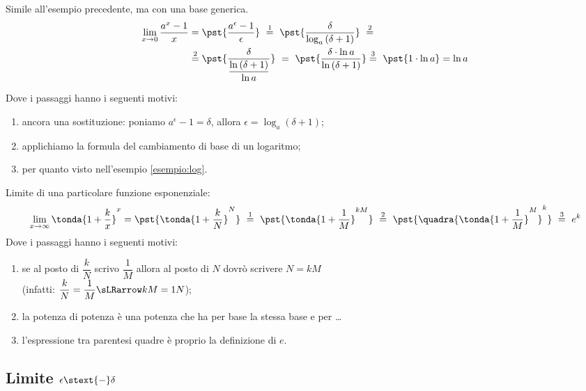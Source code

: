 \begin{esempio}
Simile all'esempio precedente, ma con una base generica.
\begin{align*}
\lim_{x \rightarrow 0} \dfrac{a^x-1}{x} &=
\pst{\dfrac{a^\epsilon-1}{\epsilon}}
~ \stackrel{1}{=} ~  
\pst{\dfrac{\delta}{\log_a{(\delta+1)}}}~ \stackrel{2}{=}\\
&\stackrel{2}{=} 
\pst{\frac{\delta}{\dfrac{\ln{(\delta+1)}}{\ln a}}} ~=~
\pst{\frac{\delta \cdot \ln a}{\ln{(\delta+1)}}} %
\stackrel{3}{=} ~ 
\pst{1 \cdot \ln a}=\ln{a}
\end{align*}

Dove i passaggi hanno i seguenti motivi:
\begin{enumerate} [nosep]
 \item ancora una sostituzione: poniamo
\(a^\epsilon-1=\delta\), allora \(\epsilon=\log_a(\delta+1)\);
 \item applichiamo la formula del cambiamento di base di un logaritmo; 
 \item per quanto visto nell'esempio \ref{esempio:log}.
\end{enumerate}
\end{esempio}

\begin{esempio}
Limite di una particolare funzione esponenziale:
\[
 \lim_{x \rightarrow \infty} \tonda{1+\dfrac{k}{x}}^x =
 \pst{\tonda{1+\dfrac{k}{N}}^N}
~ \stackrel{1}{=} ~  
\pst{\tonda{1+\dfrac{1}{M}}^{kM}}
~ \stackrel{2}{=} ~
\pst{\quadra{\tonda{1+\dfrac{1}{M}}^M}^k}
~ \stackrel{3}{=} ~ e^k
\]
Dove i passaggi hanno i seguenti motivi:
\begin{enumerate} [nosep]
 \item se al posto di \(\dfrac{k}{N}\) scrivo \(\dfrac{1}{M}\) 
allora al posto di \(N\) dovrò scrivere \(N=kM\)\\ 
(infatti: \(\dfrac{k}{N}=\dfrac{1}{M} \sLRarrow kM=1N\));
 \item la potenza di potenza è una potenza che ha per base la stessa base 
e per \dots
 \item l'espressione tra parentesi quadre è proprio la definizione di \(e\).
\end{enumerate}
\end{esempio}

\newpage %
\subsection{Limite \(\epsilon \stext{-} \delta\)}

